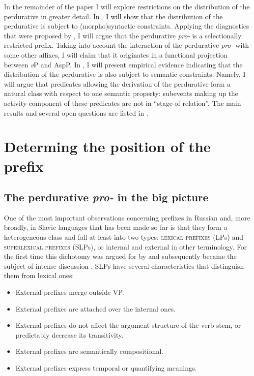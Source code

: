 \documentclass[output=paper,
]{langscibook}
\begin{document}
In the remainder of the paper I will explore restrictions on the distribution of the perdurative in greater detail. In , I will show that the distribution of the perdurative is subject to (morpho)syntactic constraints. Applying the diagnostics that were proposed by \citet{tatevosov2009mnozestvennaja,tatevosov2013mnozestvennaja}, I will argue that the perdurative \textit{pro-} is a selectionally restricted prefix. Taking into account the interaction of the perdurative \textit{pro-} with some other affixes, I will claim that it originates in a functional projection between \textit{v}P and AspP. In , I will present empirical evidence indicating that the distribution of the perdurative is also subject to semantic constraints. Namely, I will argue that predicates allowing the derivation of the perdurative form a natural class with respect to one semantic property: subevents making up the activity component of these predicates are not in  ``stage-of relation''. The main results and several open questions are listed in .


\section{Determing the position of the prefix} \label{sec:naumov:2}
\subsection{The perdurative \textit{pro-} in the big picture} \label{sec:naumov:2.1}
One of the most important observations concerning prefixes in Russian and, more broadly, in Slavic languages that has been made so far is that they form a heterogeneous class and fall at least into two types: \textsc{lexical prefixes} (LPs) and \textsc{superlexical prefixes} (SLPs), or internal and external in other terminology. For the first time this dichotomy was argued for by \citet{babko1999zero} and subsequently became the subject of intense discussion \citep[see, e.\,g.,][]{svenonius2004slavic, ramchand2005time, romanova2005superlexical, romanova2007constructing, tolskaya2015verbal}. SLPs have several characteristics that distinguish them from lexical ones:
\begin{itemize}
    \item External prefixes merge outside VP.
\item External prefixes are attached over the internal ones.
\item External prefixes do not affect the argument 	structure of the verb stem, or predictably decrease its transitivity.
\item External prefixes are semantically compositional.
\item External prefixes express temporal or quantifying meanings.
\end{itemize}
\end{document}
